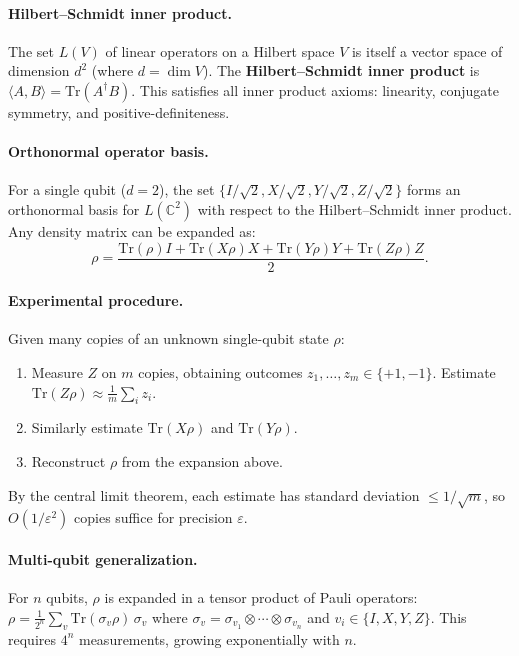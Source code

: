 \documentclass[10pt,a4paper]{article}
\begin{document}
\paragraph{Hilbert--Schmidt inner product.} The set $L(V)$ of linear operators on a Hilbert space $V$ is itself a vector space of dimension $d^2$ (where $d=\dim V$). The \textbf{Hilbert--Schmidt inner product} is $\langle A,B\rangle=\mathrm{Tr}(A^\dagger B)$. This satisfies all inner product axioms: linearity, conjugate symmetry, and positive-definiteness.

\paragraph{Orthonormal operator basis.} For a single qubit ($d=2$), the set $\{I/\sqrt{2}, X/\sqrt{2}, Y/\sqrt{2}, Z/\sqrt{2}\}$ forms an orthonormal basis for $L(\mathbb{C}^2)$ with respect to the Hilbert--Schmidt inner product. Any density matrix can be expanded as:
\[
\rho = \frac{\mathrm{Tr}(\rho)I + \mathrm{Tr}(X\rho)X + \mathrm{Tr}(Y\rho)Y + \mathrm{Tr}(Z\rho)Z}{2}.
\]

\paragraph{Experimental procedure.} Given many copies of an unknown single-qubit state $\rho$:
\begin{enumerate}[nosep]
\item Measure $Z$ on $m$ copies, obtaining outcomes $z_1,\ldots,z_m\in\{+1,-1\}$. Estimate $\mathrm{Tr}(Z\rho)\approx\frac{1}{m}\sum_i z_i$.
\item Similarly estimate $\mathrm{Tr}(X\rho)$ and $\mathrm{Tr}(Y\rho)$.
\item Reconstruct $\rho$ from the expansion above.
\end{enumerate}
By the central limit theorem, each estimate has standard deviation $\le 1/\sqrt{m}$, so $O(1/\varepsilon^2)$ copies suffice for precision $\varepsilon$.

\paragraph{Multi-qubit generalization.} For $n$ qubits, $\rho$ is expanded in a tensor product of Pauli operators: $\rho=\frac{1}{2^n}\sum_{v}\mathrm{Tr}(\sigma_v\rho)\,\sigma_v$ where $\sigma_v=\sigma_{v_1}\otimes\cdots\otimes\sigma_{v_n}$ and $v_i\in\{I,X,Y,Z\}$. This requires $4^n$ measurements, growing exponentially with $n$.
\end{document}
